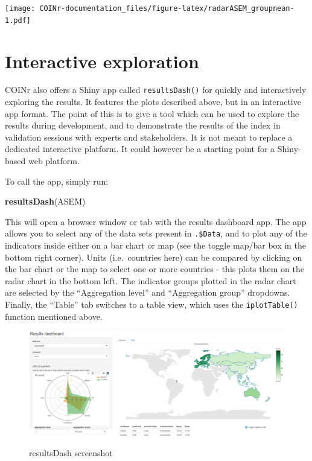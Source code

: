 \documentclass[
]{book}
\newenvironment{Shaded}{\begin{snugshade}}{\end{snugshade}}
\newcommand{\KeywordTok}[1]{\textcolor[rgb]{0.13,0.29,0.53}{\textbf{#1}}}
\newcommand{\NormalTok}[1]{#1}
\begin{document}
\texttt{[image: COINr-documentation\_files/figure-latex/radarASEM\_groupmean-1.pdf]}

\hypertarget{interactive-exploration}{%
\section{Interactive exploration}\label{interactive-exploration}}

COINr also offers a Shiny app called \texttt{resultsDash()} for quickly and interactively exploring the results. It features the plots described above, but in an interactive app format. The point of this is to give a tool which can be used to explore the results during development, and to demonstrate the results of the index in validation sessions with experts and stakeholders. It is not meant to replace a dedicated interactive platform. It could however be a starting point for a Shiny-based web platform.

To call the app, simply run:

\begin{Shaded}
\begin{Highlighting}[]
\KeywordTok{resultsDash}\NormalTok{(ASEM)}
\end{Highlighting}
\end{Shaded}

This will open a browser window or tab with the results dashboard app. The app allows you to select any of the data sets present in \texttt{.\$Data}, and to plot any of the indicators inside either on a bar chart or map (see the toggle map/bar box in the bottom right corner). Units (i.e.~countries here) can be compared by clicking on the bar chart or the map to select one or more countries - this plots them on the radar chart in the bottom left. The indicator groups plotted in the radar chart are selected by the ``Aggregation level'' and ``Aggregation group'' dropdowns. Finally, the ``Table'' tab switches to a table view, which uses the \texttt{iplotTable()} function mentioned above.

\begin{figure}

{\centering \includegraphics[width=1\linewidth]{images/resultsDash_screenshot} 

}

\caption{resultsDash screenshot}\label{fig:unnamed-chunk-51}
\end{figure}
\end{document}

